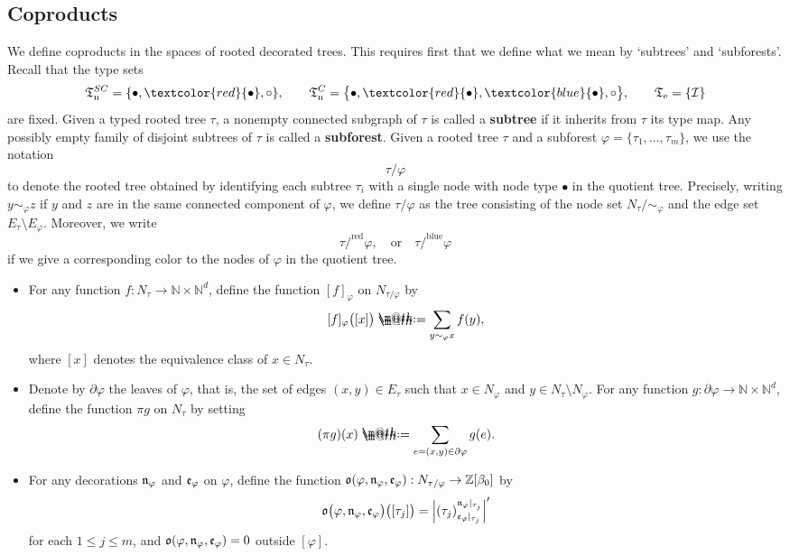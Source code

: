 \documentclass[10pt, reqno]{amsart}
\makeatletter
\numberwithin{subsection}{section}
\numberwithin{subsubsection}{subsection}
\numberwithin{equation}{section} %
\theoremstyle{mystyle}
\theoremstyle{mystyle2}
\theoremstyle{mystyle3}
\newcommand\bbN{\mathbb{N}}
\newcommand\bbZ{\mathbb{Z}}
\newcommand{\mcI}{\mathcal{I}}
\newcommand*{\defeq}{\mathrel{\rlap{%
                     \raisebox{0.3ex}{$\m@th\cdot$}}%
                     \raisebox{-0.3ex}{$\m@th\cdot$}}%
                     =}
\makeatother
\begin{document}
\bigskip



\subsection{Coproducts}
\label{SectionDecoratedTreesCoproducts}

We define coproducts in the spaces of rooted decorated trees. This requires first that we define what we mean by `subtrees' and `subforests'. Recall that the type sets
$$
\frak{T}_{\rm n}^{SC}=\{\bullet,\textcolor{red}{\bullet},\circ\},\qquad
\frak{T}_{\rm n}^{C}=\big\{\bullet,\textcolor{red}{\bullet},\textcolor{blue}{\bullet},\circ\big\},\qquad
\frak{T}_{\rm e}=\{\mcI\}
$$
are fixed. Given a typed rooted tree $\tau$, a nonempty connected subgraph of $\tau$ is called a \textbf{\textsf{subtree}} if it inherits from $\tau$ its type map. Any possibly empty family of disjoint subtrees of $\tau$ is called a \textbf{\textsf{subforest}}. Given a rooted tree $\tau$ and 
a subforest $\varphi=\big\{\tau_1,\dots,\tau_m\big\}$, we use the notation
$$
\tau/\varphi
$$
to denote the rooted tree obtained by identifying each subtree $\tau_i$ with a single node with node type $\bullet$ in the quotient tree. Precisely, writing $y\sim_\varphi z$ if $y$ and $z$ are in the same connected component of $\varphi$, we define $\tau/\varphi$ as the tree consisting of the node set $N_\tau/\sim_\varphi$ and the edge set $E_\tau\setminus E_\varphi$.
Moreover, we write
$$
\tau/^{\text{red}}\varphi,\quad\text{or}\quad \tau/^{\text{blue}}\varphi
$$
if we give a corresponding color to the nodes of $\varphi$ in the quotient tree.

\begin{itemize}
\setlength{\itemsep}{0.1cm}
\item For any function $f:N_\tau\to\bbN\times\bbN^d$, define the function 
$[f]_\varphi$ on $N_{\tau/\varphi}$ by
$$
[f]_\varphi\big([x]\big) \defeq  \sum_{y\sim_\varphi x} f(y),
$$
where $[x]$ denotes the equivalence class of $x\in N_\tau$.

\item Denote by $\partial\varphi$ the leaves of $\varphi$, that is, the set of edges $(x,y)\in E_\tau$ such that $x\in N_\varphi$ and $y\in N_\tau\setminus N_\varphi$.
For any function $g:\partial\varphi\to\bbN\times\bbN^d$, define the function $\pi g$ on $N_\tau$ by setting
$$
(\pi g)(x)\defeq \sum_{e=(x,y)\in\partial\varphi}g(e).
$$

\item For any decorations $\frak{n}_\varphi$ and $\frak{e}_\varphi$ on $\varphi$, define the function $\frak{o}(\varphi,\frak{n}_\varphi,\frak{e}_\varphi):N_{\tau/\varphi}\to\bbZ[\beta_0]$ by
$$
\frak{o}\big(\varphi,\frak{n}_\varphi,\frak{e}_\varphi\big)\big([\tau_j]\big)
=\left\vert(\tau_j)_{\frak{e}_\varphi\vert_{\tau_j}}^{\frak{n}_\varphi\vert_{\tau_j}}\right\vert'
$$
for each $1\leq j\leq m$, and $\frak{o}(\varphi,\frak{n}_\varphi,\frak{e}_\varphi)=0$ outside $[\varphi]$.
\end{itemize}
\end{document}
